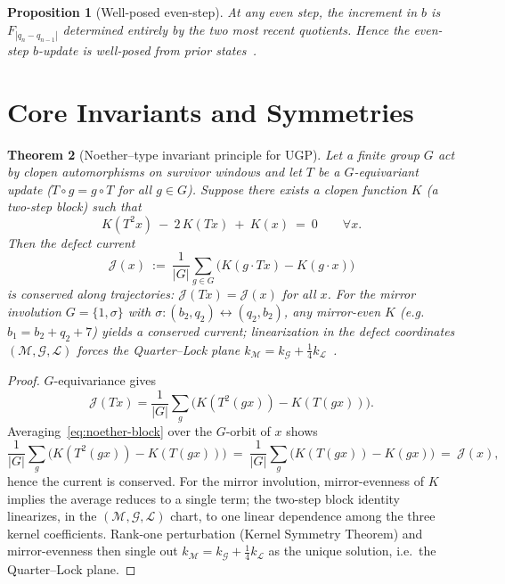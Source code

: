 \documentclass[12pt]{article}
\newtheorem{theorem}{Theorem}[section]
\newtheorem{proposition}[theorem]{Proposition}
\numberwithin{equation}{section}
\newcommand{\M}{\mathcal{M}}
\newcommand{\G}{\mathcal{G}}
\newcommand{\LL}{\mathcal{L}}
\begin{document}
\begin{proposition}[Well-posed even-step]\label{prop:even-wellposed}
At any even step, the increment in $b$ is $F_{|q_n-q_{n-1}|}$ determined entirely by the two most recent quotients. Hence the even-step $b$-update is well-posed from prior states~\cite{SpivackUGPFormalization,ugp-lean}.
\end{proposition}

\section{Core Invariants and Symmetries}\label{sec:invariants}

\begin{theorem}[Noether--type invariant principle for UGP]\label{thm:noether-ugp}
Let a finite group $G$ act by clopen automorphisms on survivor windows and let $T$ be a $G$-equivariant update ($T\circ g=g\circ T$ for all $g\in G$). Suppose there exists a clopen function $K$ (a two-step block) such that
\begin{equation}\label{eq:noether-block}
K\!\left(T^2x\right)\ -\ 2\,K\!\left(Tx\right)\ +\ K(x)\ =\ 0\qquad\forall x.
\end{equation}
Then the \emph{defect current}
\[
\mathcal{J}(x)\ :=\ \frac{1}{|G|}\sum_{g\in G}\big(K(g\cdot Tx)-K(g\cdot x)\big)
\]
is conserved along trajectories: $\mathcal{J}(Tx)=\mathcal{J}(x)$ for all $x$. For the mirror involution $G=\{1,\sigma\}$ with $\sigma:(b_2,q_2)\leftrightarrow(q_2,b_2)$, any mirror-even $K$ (e.g.\ $b_1=b_2+q_2+7$) yields a conserved current; linearization in the defect coordinates $(\M,\G,\LL)$ forces the Quarter--Lock plane $k_{\M}=k_{\G}+\tfrac14 k_{\LL}$~\cite{SpivackUGPFormalization,ugp-lean}.
\end{theorem}

\begin{proof}
$G$-equivariance gives
\[
\mathcal{J}(Tx)=\frac{1}{|G|}\sum_{g}\!\big(K(T^2(gx))-K(T(gx))\big).
\]
Averaging~\eqref{eq:noether-block} over the $G$-orbit of $x$ shows
\[
\frac{1}{|G|}\sum_{g}\!\big(K(T^2(gx))-K(T(gx))\big)\ =\ \frac{1}{|G|}\sum_{g}\!\big(K(T(gx))-K(gx)\big)\ =\ \mathcal{J}(x),
\]
hence the current is conserved. For the mirror involution, mirror-evenness of $K$ implies the average reduces to a single term; the two-step block identity linearizes, in the $(\M,\G,\LL)$ chart, to one linear dependence among the three kernel coefficients. Rank-one perturbation (Kernel Symmetry Theorem) and mirror-evenness then single out $k_{\M}=k_{\G}+\tfrac14 k_{\LL}$ as the unique solution, i.e.\ the Quarter--Lock plane.
\end{proof}
\end{document}
